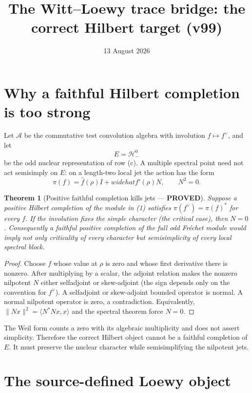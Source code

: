 \documentclass[11pt]{article}
\title{The Witt--Loewy trace bridge: the correct Hilbert target (v99)}
\date{13 August 2026}
\newcommand{\PROVED}{\textcolor{green!40!black}{\textbf{PROVED}}}
\newtheorem{theorem}{Theorem}
\begin{document}
\maketitle

\section{Why a faithful Hilbert completion is too strong}

Let $\mathcal A$ be the commutative test convolution algebra with involution
$f\mapsto f^\vee$, and let
\[
 E=\mathcal H_-^0
\]
be the odd nuclear representation of row (c).  A multiple spectral point
need not act semisimply on $E$: on a length-two local jet the action has
the form
\begin{equation}
             \pi(f)=\widehat f(\rho)I+widehat f'(\rho)N,
 \qquad N^2=0.                                      \tag{1}
\end{equation}

\begin{theorem}[Positive faithful completion kills jets --- \PROVED]
Suppose a positive Hilbert completion of the module in (1) satisfies
$\pi(f^\vee)=\pi(f)^*$ for every $f$.  If the involution fixes the simple
character (the critical case), then $N=0$.  Consequently a faithful
positive completion of the full odd Fr\'echet module would imply not only
criticality of every character but semisimplicity of every local spectral
block.
\end{theorem}

\begin{proof}
Choose $f$ whose value at $\rho$ is zero and whose first derivative there
is nonzero.  After multiplying by a scalar, the adjoint relation makes the
nonzero nilpotent $N$ either selfadjoint or skew-adjoint (the sign depends
only on the convention for $f^\vee$).  A selfadjoint or skew-adjoint
bounded operator is normal.  A normal nilpotent operator is zero, a
contradiction.  Equivalently, $\|N x\|^2=\langle N^*Nx,x\rangle$ and the
spectral theorem force $N=0$.
\end{proof}

The Weil form counts a zero with its algebraic multiplicity and does not
assert simplicity.  Therefore the correct Hilbert object cannot be a
faithful completion of $E$.  It must preserve the nuclear character while
semisimplifying the nilpotent jets.

\section{The source-defined Loewy object}
\end{document}
